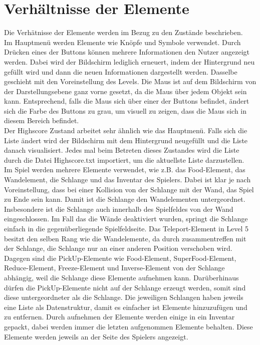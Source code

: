 \section{Verh{\"a}ltnisse der Elemente}
\label{Verhaeltnisse_der_Elemente}
%
Die Verh{\"a}tnisse der Elemente werden im Bezug zu den Zust{\"a}nde beschrieben. \\
Im Hauptmen{\"u} werden Elemente wie Kn{\"o}pfe und Symbole verwendet. Durch Dr{\"u}cken eines der Buttons k{\"o}nnen mehrere Informationen den Nutzer angezeigt werden. Dabei wird der Bildschirm lediglich erneuert, indem der Hintergrund neu gef{\"u}llt wird und dann die neuen Informationen dargestellt werden. Dasselbe geschieht mit den Voreinstellung des Levels. Die Maus ist auf dem Bildschirm von der Darstellungsebene ganz vorne gesetzt, da die Maus {\"u}ber jedem Objekt sein kann. Entsprechend, falls die Maus sich {\"u}ber einer der Buttons befindet, {\"a}ndert sich die Farbe des Buttons zu grau, um visuell zu zeigen, dass die Maus sich in diesem Bereich befindet. \\ 
Der Highscore Zustand arbeitet sehr {\"a}hnlich wie das Hauptmen{\"u}. Falls sich die Liste {\"a}ndert wird der Bildschirm mit dem Hintergrund neugef{\"u}llt und die Liste danach visualisiert. Jedes mal beim Betreten dieses Zustandes wird die Liste durch die Datei \glqq Highscore.txt\grqq{} importiert, um die aktuellste Liste darzustellen. \\
Im Spiel werden mehrere Elemente verwendet, wie z.B. das Food-Element, das Wandelement, die Schlange und das Inventar des Spielers. Dabei ist klar je nach Voreinstellung, dass bei einer Kollision von der Schlange mit der Wand, das Spiel zu Ende sein kann. Damit ist die Schlange den Wandelementen untergeordnet. Insbesondere ist die Schlange auch innerhalb des Spielfeldes von der Wand eingeschlossen. Im Fall das die W{\"a}nde deaktiviert wurden, springt die Schlange einfach in die gegen{\"u}berliegende Spielfeldseite. Das Teleport-Element in Level 5 besitzt den selben Rang wie die Wandelemente, da durch zusammentreffen mit der Schlange, die Schlange nur an einer anderen Position verschoben wird. Dagegen sind die PickUp-Elemente wie Food-Element, SuperFood-Element, Reduce-Element, Freeze-Element und Inverse-Element von der Schlange abh{\"a}ngig, weil die Schlange diese Elemente aufnehmen kann. Dar{\"u}berhinaus d{\"u}rfen die PickUp-Elemente nicht auf der Schlange erzeugt werden, somit sind diese untergeordneter als die Schlange. Die jeweiligen Schlangen haben jeweils eine Liste als Datenstruktur, damit es einfacher ist Elemente hinzuzuf{\"u}gen und zu entfernen. Durch aufnehmen der Elemente werden einige in ein Inventar gepackt, dabei werden immer die letzten aufgenommen Elemente behalten. Diese Elemente werden jeweils an der Seite des Spielers angezeigt. 

 
%